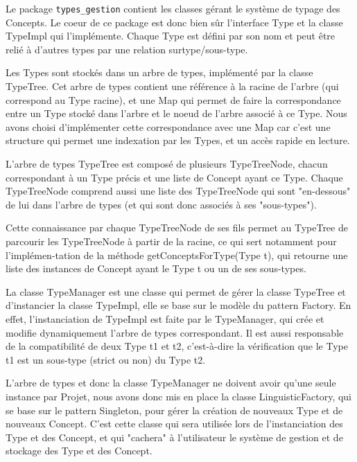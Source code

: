 \documentclass[12pt]{report}
\begin{document}
Le package \texttt{types\_gestion} contient les classes gérant le système de typage des Concepts. Le coeur de ce package est donc bien sûr l'interface Type et la classe TypeImpl qui l'implémente.
Chaque Type est défini par son nom et peut être relié à d'autres types par une relation surtype/sous-type.

\bigskip

Les Types sont stockés dans un arbre de types, implémenté par la classe TypeTree. Cet arbre de types contient une référence à la racine de l'arbre (qui correspond au Type racine), et une Map qui permet de faire la correspondance entre un Type stocké dans l'arbre et le noeud de l'arbre associé à ce Type. Nous avons choisi d'implémenter cette correspondance avec une Map car c'est une structure qui permet une indexation par les Types, et un accès rapide en lecture.

L'arbre de types TypeTree est composé de plusieurs TypeTreeNode, chacun correspondant à un Type précis et une liste de Concept ayant ce Type. Chaque TypeTreeNode comprend aussi une liste des TypeTreeNode qui sont "en-dessous" de lui dans l'arbre de types (et qui sont donc associés à ses "sous-types").

Cette connaissance par chaque TypeTreeNode de ses fils permet au TypeTree de parcourir les TypeTreeNode à partir de la racine, ce qui sert notamment pour l'implémen-tation de la méthode getConceptsForType(Type t), qui retourne une liste des instances de Concept ayant le Type t ou un de ses sous-types.

\bigskip

La classe TypeManager est une classe qui permet de gérer la classe TypeTree et d'instancier la classe TypeImpl, elle se base sur le modèle du pattern Factory. En effet, l'instanciation de TypeImpl est faite par le TypeManager, qui crée et modifie dynamiquement l'arbre de types correspondant. Il est aussi responsable de la compatibilité de deux Type t1 et t2, c'est-à-dire la vérification que le Type t1 est un sous-type (strict ou non) du Type t2.

\bigskip

L'arbre de types et donc la classe TypeManager ne doivent avoir qu'une seule instance par Projet, nous avons donc mis en place la classe LinguisticFactory, qui se base sur le pattern Singleton, pour gérer la création de nouveaux Type et de nouveaux Concept. C'est cette classe qui sera utilisée lors de l'instanciation des Type et des Concept, et qui "cachera" à l'utilisateur le système de gestion et de stockage des Type et des Concept.
\end{document}
